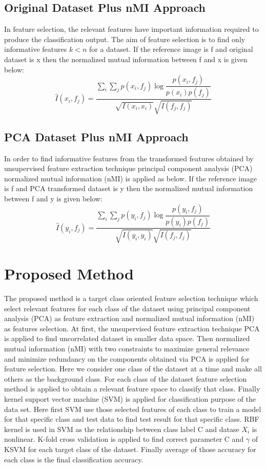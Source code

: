 \documentclass[document.tex]{subfiles}
\begin{document}
\subsection{Original Dataset Plus nMI Approach}
\noindent In feature selection, the relevant features have important
information required to produce the classification output. The aim of feature selection is to find only informative features $k < n$ for a dataset. If the reference image is f and original dataset is x then the normalized mutual information between f and x is given below:
\begin{equation}
\hat{I}(x_i,f_j) = \dfrac{\sum_{i}\sum_{j} p(x_i,f_j)\log\dfrac{p(x_i,f_j)}{p(x_i)p(f_j)}}{\sqrt{I(x_i,x_i)}\sqrt{I(f_j,f_j)}}
\end{equation}  

\subsection{PCA Dataset Plus nMI Approach}
\noindent In order to find informative features from the transformed features
obtained by unsupervised feature extraction technique principal component analysis (PCA) normalized mutual information (nMI) is applied as below. If the reference image is f and PCA transformed dataset is y then the normalized mutual information between f and y is given below:
\begin{equation}
\hat{I}(y_i,f_j) = \dfrac{\sum_{i}\sum_{j} p(y_i,f_j)\log\dfrac{p(y_i,f_j)}{p(y_i)p(f_j)}}{\sqrt{I(y_i,y_i)}\sqrt{I(f_j,f_j)}}
\end{equation}  

\section{Proposed Method}
\noindent The proposed method is a target class oriented feature selection technique which select relevant features for each class of the dataset using principal component analysis (PCA) as feature extraction\cite{7} and normalized mutual information (nMI) as features selection\cite{9}. At first, the unsupervised feature extraction technique PCA is applied to find uncorrelated dataset in smaller data space. Then normalized mutual information (nMI) with two constraints to maximize general relevance and minimize redundancy on the components obtained via PCA is applied for feature selection\cite{21}. Here we consider one class of the dataset at a time and make all others as the background class. For each class of the dataset feature selection method is applied to obtain a relevant feature space to classify that class. Finally kernel support vector machine (SVM) is applied for classification purpose of the data set\cite{11}. Here first SVM use those selected features of each class to train a model for that specific class and test data to find test result for that specific class. RBF kernel\cite{22} is used in SVM as the relationship between class label C and datase $X_i$ is nonlinear. K-fold cross validation is applied to find correct parameter C and $\gamma$ of KSVM for each target class of the dataset. Finally average of those accuracy for each class is the final classification accuracy.
\end{document}
